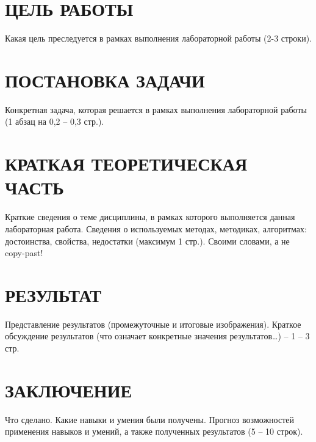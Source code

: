 \section{ЦЕЛЬ РАБОТЫ}
Какая цель преследуется в рамках выполнения лабораторной работы (2-3 строки).

\section{ПОСТАНОВКА ЗАДАЧИ}
Конкретная задача, которая решается в рамках выполнения лабораторной работы (1 абзац на 0,2 – 0,3 стр.).
\section{КРАТКАЯ ТЕОРЕТИЧЕСКАЯ ЧАСТЬ}
Краткие сведения о теме дисциплины, в рамках которого выполняется данная лабораторная работа. Сведения о используемых методах, методиках, алгоритмах: достоинства, свойства, недостатки (максимум 1 стр.). Своими словами, а не copy-past!
\section{РЕЗУЛЬТАТ}
Представление результатов (промежуточные и итоговые изображения). Краткое обсуждение результатов (что означает конкретные значения результатов…) – 1 – 3 стр.
\section{ЗАКЛЮЧЕНИЕ}
Что сделано. Какие навыки и умения были получены. Прогноз возможностей применения навыков и умений, а также полученных результатов (5 – 10 строк).
